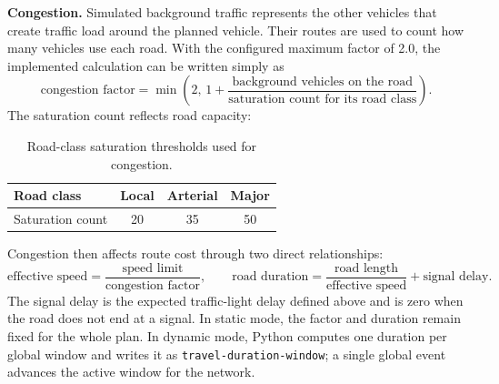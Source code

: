 \documentclass[10pt]{article}
\begin{document}
\textbf{Congestion.} Simulated background traffic represents the other
vehicles that create traffic load around the planned vehicle. Their routes are
used to count how many vehicles use each road. With the configured maximum
factor of 2.0, the implemented calculation can be written simply as
\[
 \text{congestion factor}
 =\min\!\left(2,\,1+\frac{\text{background vehicles on the road}}
                         {\text{saturation count for its road class}}\right).
\]
The saturation count reflects road capacity:

\begin{table}[H]
\centering
\caption{Road-class saturation thresholds used for congestion.}
\label{tab:congestion-saturation}
\scriptsize

\begin{tabular}{@{}lccc@{}}
\toprule
Road class & Local & Arterial & Major \\
\midrule
Saturation count & 20 & 35 & 50 \\
\bottomrule
\end{tabular}

\end{table}

Congestion then affects route cost through two direct relationships:
\[
 \text{effective speed}=\frac{\text{speed limit}}{\text{congestion factor}},
 \qquad
 \text{road duration}=\frac{\text{road length}}{\text{effective speed}}
                       +\text{signal delay}.
\]
The signal delay is the expected traffic-light delay defined above and is zero
when the road does not end at a signal. In static mode, the factor and duration
remain fixed for the whole plan. In dynamic mode, Python computes one duration
per global window and writes it as \texttt{travel-duration-window}; a single
global event advances the active window for the network.
\end{document}
